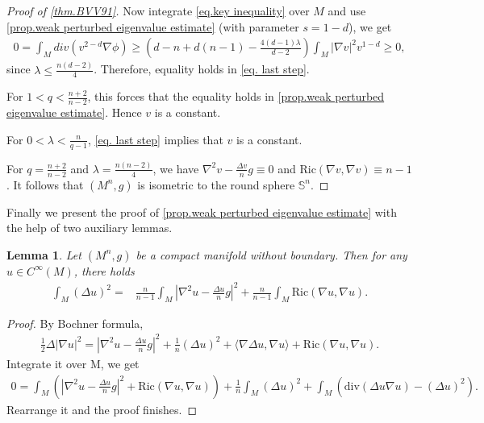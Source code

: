 \documentclass[12pt]{amsart}
\newtheorem{lemma}{Lemma}
\numberwithin{equation}{section}
\numberwithin{lemma}{section}
\numberwithin{proposition}{section}
\numberwithin{corollary}{section}
\numberwithin{remark}{section}
\begin{document}
\begin{proof}[Proof of \cref{thm.BVV91}]
    Now integrate \cref{eq.key inequality} over $M$ and use \cref{prop.weak perturbed eigenvalue estimate} (with parameter $s=1-d$), we get
    \begin{align}\label{eq. last step}
        0=\int_M div(v^{2-d}\nabla \phi)
        \geq\left(d-n+d(n-1)-\frac{4(d-1)\lambda}{d-2}\right)\int_M |\nabla v|^2v^{1-d}\geq 0,
    \end{align}
    since $\lambda \leq \frac{n(d-2)}{4}$. Therefore, equality holds in \cref{eq. last step}.
    
    For $1<q<\frac{n+2}{n-2}$, this forces that  the equality holds in \cref{prop.weak perturbed eigenvalue estimate}. Hence $v$ is a constant.

    For $0<\lambda<\frac{n}{q-1}$, \cref{eq. last step} implies that $v$ is a constant.

    For $q=\frac{n+2}{n-2}$ and $\lambda=\frac{n(n-2)}{4}$, we have $\nabla^2 v-\frac{\Delta v}{n}g\equiv 0$ and $\mathrm{Ric}(\nabla v,\nabla v)\equiv n-1$. It follows that $(M^n,g)$ is isometric to the round sphere $\mathbb{S}^n$.
\end{proof}

Finally we present the proof of \cref{prop.weak perturbed eigenvalue estimate} with the help of two auxiliary lemmas. 

\begin{lemma}\label{lem.laplace squared}
        Let $(M^n,g)$ be a compact manifold without boundary. Then for any $u\in C^{\infty}(M)$, there holds
        \begin{align*}
            \int_M(\Delta u)^2
            =&\frac{n}{n-1}\int_M
            \left|\nabla^2 u-\frac{\Delta u}{n}g\right|^2
            +\frac{n}{n-1}\int_M \mathrm{Ric}(\nabla u,\nabla u).
        \end{align*}
    \end{lemma}
    \begin{proof}
        By Bochner formula, 
        \begin{align*}
            \frac{1}{2}\Delta |\nabla u|^2=\left|\nabla^2 u-\frac{\Delta u}{n}g\right|^2
            +\frac{1}{n}(\Delta u)^2
            +\langle\nabla \Delta u,\nabla u\rangle
            +\mathrm{Ric}(\nabla u,\nabla u).
        \end{align*}
        Integrate it over M, we get
        \begin{align*}
           0=\int_M\left(\left|\nabla^2 u-\frac{\Delta u}{n}g\right|^2+\mathrm{Ric}(\nabla u,\nabla u)\right)
            +\frac{1}{n}\int_M(\Delta u)^2
            +\int_M (\mathrm{div}(\Delta u\nabla u)-(\Delta u)^2).
        \end{align*}
        Rearrange it and the proof finishes.
    \end{proof}
\end{document}
